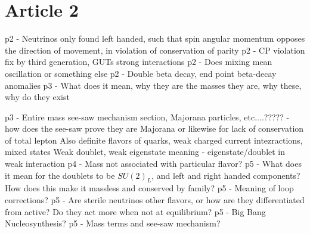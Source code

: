 \documentclass[11 pt, twoside]{article}
\newenvironment{outline*}
{
	\begin{outline}[enumerate]
	}
	{\end{outline}
}
\begin{document}
\section{Article 2}
\begin{outline*}
\1 p2 - Neutrinos only found left handed, such that spin angular momentum opposes the direction of movement, in violation of conservation of parity
\1 p2 - CP violation fix by third generation, GUTs strong interactions
\1 p2 - Does mixing mean oscillation or something else
\1 p2 - Double beta decay, end point beta-decay anomalies
\1 p3 - What does it mean, why they are the masses they are, why these, why do they exist

\1 p3 - Entire mass see-saw mechanism section, Majorana particles, etc....????? - how does the see-saw prove they are Majorana or likewise for lack of conservation of total lepton
\2 Also definite flavors of quarks, weak charged current intezractions, mixed states
\2 Weak doublet, weak eigenstate meaning - eigenstate/doublet in weak interaction
\1 p4 - Mass not associated with particular flavor?
\1 p5 - What does it mean for the doublets to be $SU(2)_L$, and left and right handed components? How does this make it massless and conserved by family?
\1 p5 - Meaning of loop corrections?
\1 p5 - Are sterile neutrinos other flavors, or how are they differentiated from active? Do they act more when not at equilibrium?
\1 p5 - Big Bang Nucleosynthesis?
\1 p5 - Mass terms and see-saw mechanism?
\end{outline*}
\end{document}
